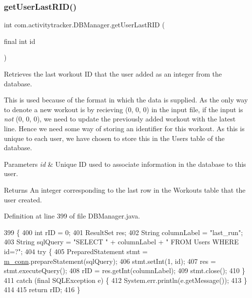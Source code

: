 \subsubsection{\texorpdfstring{get\+User\+Last\+R\+I\+D()}{getUserLastRID()}}
{\footnotesize\ttfamily int com.\+activitytracker.\+D\+B\+Manager.\+get\+User\+Last\+R\+ID (\begin{DoxyParamCaption}\item[{final int}]{id }\end{DoxyParamCaption})}

Retrieves the last workout ID that the user added as an integer from the database.

This is used because of the format in which the data is supplied. As the only way to denote a new workout is by recieving (0, 0, 0) in the input file, if the input is {\itshape not} (0, 0, 0), we need to update the previously added workout with the latest line. Hence we need some way of storing an identifier for this workout. As this is unique to each user, we have chosen to store this in the Users table of the database.


\begin{DoxyParams}{Parameters}
{\em id} & Unique ID used to associate information in the database to this user. \\
\hline
\end{DoxyParams}
\begin{DoxyReturn}{Returns}
An integer corresponding to the last row in the Workouts table that the user created. 
\end{DoxyReturn}


Definition at line 399 of file D\+B\+Manager.\+java.


\begin{DoxyCode}
399                                             \{
400         \textcolor{keywordtype}{int} rID = 0;
401         ResultSet res;
402         String columnLabel = \textcolor{stringliteral}{"last\_run"};
403         String sqlQuery = \textcolor{stringliteral}{"SELECT "} + columnLabel + \textcolor{stringliteral}{" FROM Users WHERE id=?"};
404         \textcolor{keywordflow}{try} \{
405             PreparedStatement stmt = \mbox{\hyperlink{classcom_1_1activitytracker_1_1_d_b_manager_a064088d13ac09eb147fdc19268771521}{m\_conn}}.prepareStatement(sqlQuery);
406             stmt.setInt(1, \textcolor{keywordtype}{id});
407             res = stmt.executeQuery();
408             rID = res.getInt(columnLabel);
409             stmt.close();
410         \}
411         \textcolor{keywordflow}{catch} (\textcolor{keyword}{final} SQLException e) \{
412             System.err.println(e.getMessage());
413         \}
414 
415         \textcolor{keywordflow}{return} rID;
416     \}
\end{DoxyCode}
\mbox{\label{classcom_1_1activitytracker_1_1_d_b_manager_aeab864b072cc08c0521e80ae1f459ca7}} 

